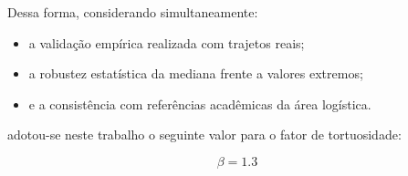 Dessa forma, considerando simultaneamente:
\begin{itemize}
    \item a validação empírica realizada com trajetos reais;
    \item a robustez estatística da mediana frente a valores extremos;
    \item e a consistência com referências acadêmicas da área logística.
\end{itemize}

adotou-se neste trabalho o seguinte valor para o fator de tortuosidade:

\[
\boxed{\beta = 1.3}
\]

\bigskip


